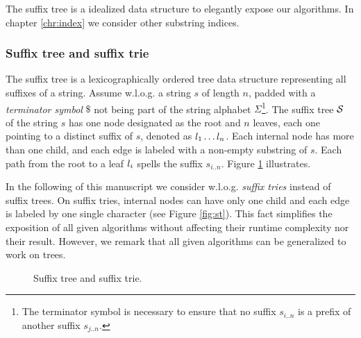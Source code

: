 The suffix tree is a idealized data structure to elegantly expose our algorithms. In chapter \ref{chr:index} we consider other substring indices.

\subsubsection{Suffix tree and suffix trie}

The suffix tree \citep{Morrison1968} is a lexicographically ordered tree data structure representing all suffixes of a string.
Assume w.l.o.g. a string $s$ of length $n$, padded with a \emph{terminator symbol} $\$$ not being part of the string alphabet $\Sigma$\footnote{The terminator symbol is necessary to ensure that no suffix $s_{i..n}$ is a prefix of another suffix $s_{j..n}$.}.
The suffix tree $\mathcal {S}$ of the string $s$ has one node designated as the root and $n$ leaves, each one pointing to a distinct suffix of $s$, denoted as $l_1 \dots l_n$.
Each internal node has more than one child, and each edge is labeled with a non-empty substring of $s$.
Each path from the root to a leaf $l_i$ spells the suffix $s_{i..n}$.
Figure \ref{fig:stree} illustrates.



In the following of this manuscript we consider w.l.o.g. \emph{suffix tries} instead of suffix trees.
On suffix tries, internal nodes can have only one child and each edge is labeled by one single character (see Figure \ref{fig:st}).
This fact simplifies the exposition of all given algorithms without affecting their runtime complexity nor their result.
However, we remark that all given algorithms can be generalized to work on trees.

\begin{figure}[h]
\begin{center}
\caption{Suffix tree and suffix trie.}
\label{fig:stree}

\end{center}
\end{figure}

